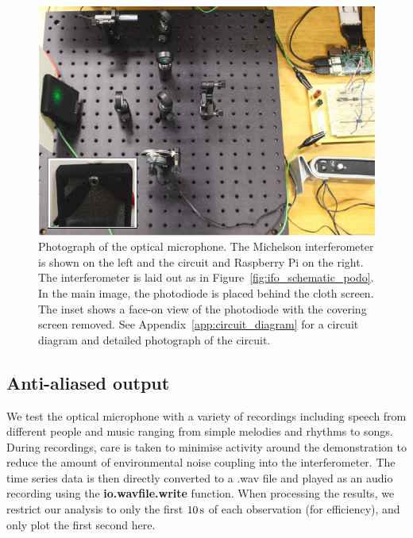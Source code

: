 \documentclass[paper-main.tex]{subfiles}
\begin{document}
\begin{figure}
	\includegraphics[width=.7\textwidth]{figures/setup_pic2.pdf}
\caption{Photograph of the optical microphone. The Michelson interferometer is shown on the left and the circuit and Raspberry Pi on the right. The interferometer is laid out as in Figure~\ref{fig:ifo_schematic_podo}. In the main image, the photodiode is placed behind the cloth screen. The inset shows a face-on view of the photodiode with the covering screen removed. See Appendix~\ref{app:circuit_diagram} for a circuit diagram and detailed photograph of the circuit.}
	\label{fig:setup_pic2}
\end{figure}


\subsection{Anti-aliased output}
\label{sec:initialResultsOpMic}

We test the optical microphone with a variety of recordings including speech from different people and music ranging from simple melodies and rhythms to songs. During recordings, care is taken to minimise activity around the demonstration to reduce the amount of environmental noise coupling into the interferometer. The time series data is then directly converted to a .wav file and played as an audio recording using the \textbf{io.wavfile.write} function. When processing the results, we restrict our analysis to only the first $10\,{\rm s}$ of each observation (for efficiency), and only plot the first second here. 
\end{document}
